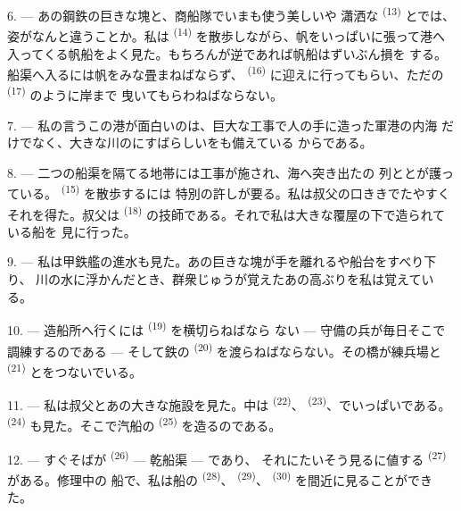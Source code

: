 6. --- あの鋼鉄の巨きな塊と、商船隊でいまも使う美しいや
瀟洒な \textsuperscript{(13)} とでは、姿がなんと違うことか。私は
 \textsuperscript{(14)} を散歩しながら、帆をいっぱいに張って港へ
入ってくる帆船をよく見た。もちろんが逆であれば帆船はずいぶん損を
する。船渠へ入るには帆をみな畳まねばならず、 \textsuperscript{(16)}
に迎えに行ってもらい、ただの \textsuperscript{(17)} のように岸まで
曳いてもらわねばならない。

\VUsaut{3.0mm}
\VUsaut{3.0mm}

7. --- 私の言うこの港が面白いのは、巨大な工事で人の手に造った軍港の内海
だけでなく、大きな川のにすばらしいをも備えている
からである。

8. --- 二つの船渠を隔てる地帯には工事が施され、海へ突き出たの
列ととが護っている。 \textsuperscript{(15)} を散歩するには
特別の許しが要る。私は叔父の口ききでたやすくそれを得た。叔父は
\textsuperscript{(18)} の技師である。それで私は大きな覆屋の下で造られている船を
見に行った。

9. --- 私は甲鉄艦の進水も見た。あの巨きな塊が手を離れるや船台をすべり下り、
川の水に浮かんだとき、群衆じゅうが覚えたあの高ぶりを私は覚えている。

10. --- 造船所へ行くには \textsuperscript{(19)} を横切らねばなら
ない --- 守備の兵が毎日そこで調練するのである --- そして鉄の
\textsuperscript{(20)} を渡らねばならない。その橋が練兵場と
\textsuperscript{(21)} とをつないでいる。

\VUsaut{3.0mm}
\VUsaut{3.0mm}

11. --- 私は叔父とあの大きな施設を見た。中は \textsuperscript{(22)}、
 \textsuperscript{(23)}、でいっぱいである。 \textsuperscript{(24)} も見た。そこで汽船の
\textsuperscript{(25)} を造るのである。

12. --- すぐそばが \textsuperscript{(26)} --- 乾船渠 --- であり、
それにたいそう見るに値する \textsuperscript{(27)} がある。修理中の
船で、私は船の \textsuperscript{(28)}、
\textsuperscript{(29)}、 \textsuperscript{(30)} を間近に見ることができた。

